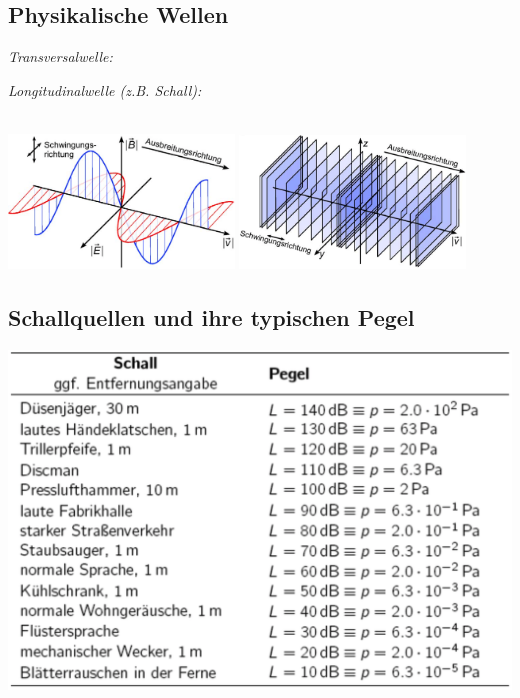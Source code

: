 \documentclass[german,color,6pt]{latex4ei/latex4ei_sheet}
\begin{document}
\begin{sectionbox}
	\subsection{Physikalische Wellen}
	\parbox{0.5\textwidth}{\emph{Transversalwelle:}}
	\parbox{0.45\textwidth}{\emph{Longitudinalwelle (z.B. Schall):}} \\
	\includegraphics[width=0.45\textwidth]{transversalwelle}
	\hspace{0.05\textwidth}
	\includegraphics[width=0.45\textwidth]{longitudinalwelle}
\end{sectionbox}

\begin{sectionbox}
	\subsection{Schallquellen und ihre typischen Pegel}
	\includegraphics[width=\textwidth]{schallpegel}
\end{sectionbox}
\end{document}
